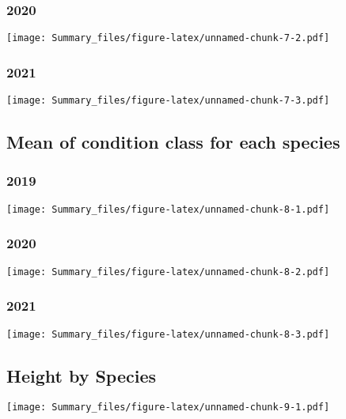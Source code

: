 \documentclass[
]{article}
\begin{document}
\hypertarget{section-10}{%
\subsubsection{2020}\label{section-10}}

\texttt{[image: Summary\_files/figure-latex/unnamed-chunk-7-2.pdf]}

\hypertarget{section-11}{%
\subsubsection{2021}\label{section-11}}

\texttt{[image: Summary\_files/figure-latex/unnamed-chunk-7-3.pdf]}

\hypertarget{mean-of-condition-class-for-each-species}{%
\subsection{Mean of condition class for each
species}\label{mean-of-condition-class-for-each-species}}

\hypertarget{section-12}{%
\subsubsection{2019}\label{section-12}}

\texttt{[image: Summary\_files/figure-latex/unnamed-chunk-8-1.pdf]}

\hypertarget{section-13}{%
\subsubsection{2020}\label{section-13}}

\texttt{[image: Summary\_files/figure-latex/unnamed-chunk-8-2.pdf]}

\hypertarget{section-14}{%
\subsubsection{2021}\label{section-14}}

\texttt{[image: Summary\_files/figure-latex/unnamed-chunk-8-3.pdf]}

\hypertarget{height-by-species}{%
\subsection{Height by Species}\label{height-by-species}}

\texttt{[image: Summary\_files/figure-latex/unnamed-chunk-9-1.pdf]}
\end{document}
